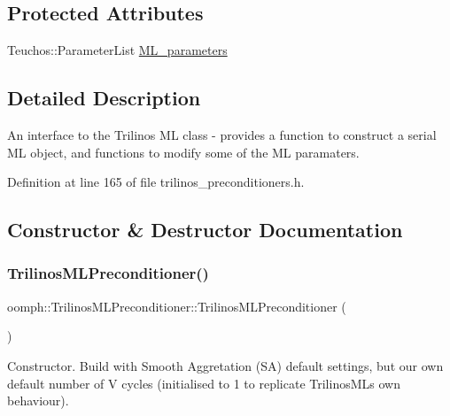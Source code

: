 \subsection*{Protected Attributes}
\begin{DoxyCompactItemize}
\item 
Teuchos\+::\+Parameter\+List \hyperlink{classoomph_1_1TrilinosMLPreconditioner_aa324e487780da0351288965209253e74}{M\+L\+\_\+parameters}
\end{DoxyCompactItemize}


\subsection{Detailed Description}
An interface to the Trilinos ML class -\/ provides a function to construct a serial ML object, and functions to modify some of the ML paramaters. 

Definition at line 165 of file trilinos\+\_\+preconditioners.\+h.



\subsection{Constructor \& Destructor Documentation}
\mbox{\label{classoomph_1_1TrilinosMLPreconditioner_a98c9e7ce547973570a53b138912ea20a}} 
\subsubsection{\texorpdfstring{Trilinos\+M\+L\+Preconditioner()}{TrilinosMLPreconditioner()}\hspace{0.1cm}{\footnotesize\ttfamily [1/2]}}
{\footnotesize\ttfamily oomph\+::\+Trilinos\+M\+L\+Preconditioner\+::\+Trilinos\+M\+L\+Preconditioner (\begin{DoxyParamCaption}{ }\end{DoxyParamCaption})\hspace{0.3cm}{\ttfamily [inline]}}



Constructor. Build with Smooth Aggretation (SA) default settings, but our own default number of V cycles (initialised to 1 to replicate Trilinos\+ML\textquotesingle{}s own behaviour). 



